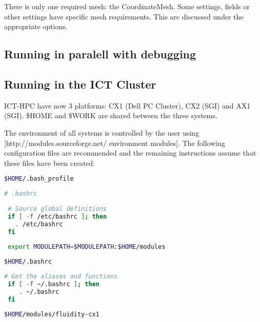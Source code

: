 There is only one required mesh: the CoordinateMesh. Some settings, fields or other
settings have specific mesh requirements. This are discussed under the appropriate options.

\subsection{Running in paralell with debugging}

\subsection{Running in the ICT Cluster}

ICT-HPC have now 3 platforms: CX1 (Dell PC Cluster), CX2 (SGI) and AX1 (SGI). \$HOME and \$WORK are shared between the three systems.

The environment of all systems is controlled by the user using [http://modules.sourceforge.net/ environment modules]. The following configuration files are recommended and the remaining instructions assume that these files have been created:

\begin{lstlisting}[language=bash]
$HOME/.bash_profile
\end{lstlisting}

\begin{lstlisting}[language=bash]
 # .bashrc
 
 # Source global definitions
 if [ -f /etc/bashrc ]; then
   . /etc/bashrc
 fi
 
 export MODULEPATH=$MODULEPATH:$HOME/modules
\end{lstlisting}

\begin{lstlisting}[language=bash]
$HOME/.bashrc
\end{lstlisting}

\begin{lstlisting}[language=bash]
 # Get the aliases and functions
 if [ -f ~/.bashrc ]; then
 	. ~/.bashrc
 fi
\end{lstlisting}


\begin{lstlisting}[language=bash]
$HOME/modules/fluidity-cx1
\end{lstlisting}
